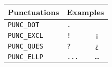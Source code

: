 	\begin{tabular}{|l|ll|}
	
	\hline
		\multicolumn{1}{|c|}{Punctuations} &
		\multicolumn{6}{|c|}{Examples} \\
	\hline
	\verb+PUNC_DOT+ & \verb+.+ & \verb++ \\
	\verb+PUNC_EXCL+ & \verb+!+ & \verb+¡+ \\
	\verb+PUNC_QUES+ & \verb+?+ & \verb+¿+ \\
	\verb+PUNC_ELLP+ & \verb+...+ & \verb+…+ \\
	\hline

	\end{tabular}

